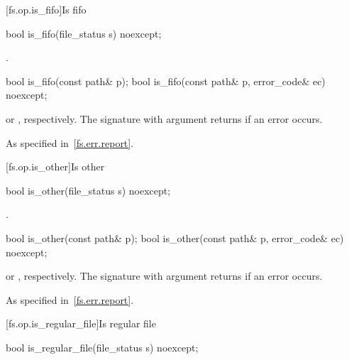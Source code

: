 [fs.op.is_fifo]{Is fifo}

%
\begin{itemdecl}
bool is_fifo(file_status s) noexcept;
\end{itemdecl}

\begin{itemdescr}
\pnum
\returns {}.
\end{itemdescr}


%
\begin{itemdecl}
bool is_fifo(const path& p);
bool is_fifo(const path& p, error_code& ec) noexcept;
\end{itemdecl}

\begin{itemdescr}
\pnum
\returns {} or , respectively.
The signature with argument  returns  if an error occurs.

\pnum
\throws As specified in~\ref{fs.err.report}.
\end{itemdescr}


[fs.op.is_other]{Is other}

%
\begin{itemdecl}
bool is_other(file_status s) noexcept;
\end{itemdecl}

\begin{itemdescr}
\pnum
\returns {}.
\end{itemdescr}

%
\begin{itemdecl}
bool is_other(const path& p);
bool is_other(const path& p, error_code& ec) noexcept;
\end{itemdecl}

\begin{itemdescr}
\pnum
\returns {} or ,
  respectively. The signature with argument  returns 
  if an error occurs.

\pnum
\throws As specified in~\ref{fs.err.report}.
\end{itemdescr}


[fs.op.is_regular_file]{Is regular file}

%
\begin{itemdecl}
bool is_regular_file(file_status s) noexcept;
\end{itemdecl}


